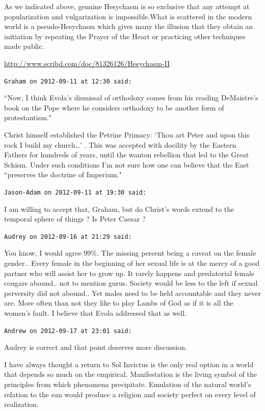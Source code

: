 \begin{footnotesize}
\begin{sffamily}
As we indicated above, genuine Hesychasm is so exclusive that any attempt at popularization and vulgarization is impossible.What is scattered in the modern world is a pseudo-Hesychasm which gives many the illusion that they obtain an initiation by repeating the Prayer of the Heart or practicing other techniques made public.

\url{http://www.scribd.com/doc/81326126/Hesychasm-II}


\hfill

\texttt{Graham on 2012-09-11 at 12:30 said: }

``Now, I think Evola's dismissal of orthodoxy comes from his reading DeMaistre's book on the Pope where he considers orthodoxy to be another form of protestantism."

Christ himself established the Petrine Primacy: `Thou art Peter and upon this rock I build my church…’ . This was accepted with docility by the Eastern Fathers for hundreds of years, until the wanton rebellion that led to the Great Schism. Under such conditions I'm not sure how one can believe that the East ``preserves the doctrine of Imperium."


\hfill

\texttt{Jason-Adam on 2012-09-11 at 19:30 said: }

I am willing to accept that, Graham, but do Christ's words extend to the temporal sphere of things ? Is Peter Caesar ?


\hfill

\texttt{Audrey on 2012-09-16 at 21:29 said: }

You know, I would agree 99\%. The missing percent being a caveat on the female gender.. Every female in the beginning of her sexual life is at the mercy of a good partner who will assist her to grow up. It rarely happens and predatorial female cougars abound.. not to mention gurus. Society would be less to the left if sexual perversity did not abound.. Yet males need to be held accountable and they never are. More often than not they like to play Lambs of God as if it is all the women's fault. I believe that Evola addressed that as well.


\hfill

\texttt{Andrew on 2012-09-17 at 23:01 said: }

Audrey is correct and that point deserves more discussion.

I have always thought a return to Sol Invictus is the only real option in a world that depends so much on the empirical. Manifestation is the living symbol of the principles from which phenomena precipitate. Emulation of the natural world's relation to the sun would produce a religion and society perfect on every level of realization.



\end{sffamily}
\end{footnotesize}
